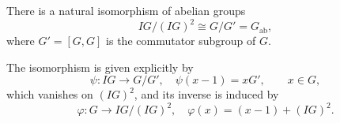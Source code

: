 \begin{lemma}[4.1]
There is a natural isomorphism of abelian groups
$$IG / (IG)^2 \cong G / G' = G_{\mathrm{ab}},$$
where $G' = [G, G]$ is the commutator subgroup of $G$.
\end{lemma}

The isomorphism is given explicitly by
$$\psi: IG \to G/G', \quad \psi(x - 1) = xG', \qquad x \in G,$$
which vanishes on $(IG)^2$, and its inverse is induced by
$$\varphi: G \to IG/(IG)^2, \quad \varphi(x) = (x - 1) + (IG)^2.$$
